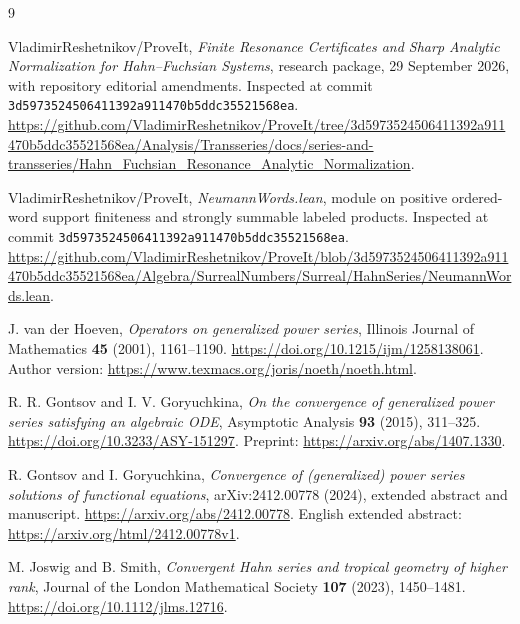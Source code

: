 \documentclass[11pt,a4paper]{article}
\numberwithin{equation}{section}
\theoremstyle{definition}
\theoremstyle{remark}
\newcommand{\snap}{\texttt{3d5973524506411392a911470b5ddc35521568ea}}
\begin{document}
\clearpage
\begin{thebibliography}{9}
\raggedright
{}
VladimirReshetnikov/ProveIt,
\emph{Finite Resonance Certificates and Sharp Analytic Normalization for
Hahn--Fuchsian Systems}, research package, 29 September 2026, with repository
editorial amendments. Inspected at commit \snap.
\url{https://github.com/VladimirReshetnikov/ProveIt/tree/3d5973524506411392a911470b5ddc35521568ea/Analysis/Transseries/docs/series-and-transseries/Hahn_Fuchsian_Resonance_Analytic_Normalization}.

VladimirReshetnikov/ProveIt,
\emph{NeumannWords.lean}, module on positive ordered-word support finiteness
and strongly summable labeled products. Inspected at commit \snap.
\url{https://github.com/VladimirReshetnikov/ProveIt/blob/3d5973524506411392a911470b5ddc35521568ea/Algebra/SurrealNumbers/Surreal/HahnSeries/NeumannWords.lean}.

J. van der Hoeven,
\emph{Operators on generalized power series},
Illinois Journal of Mathematics \textbf{45} (2001), 1161--1190.
\url{https://doi.org/10.1215/ijm/1258138061}.
Author version: \url{https://www.texmacs.org/joris/noeth/noeth.html}.

R. R. Gontsov and I. V. Goryuchkina,
\emph{On the convergence of generalized power series satisfying an
algebraic ODE}, Asymptotic Analysis \textbf{93} (2015), 311--325.
\url{https://doi.org/10.3233/ASY-151297}.
Preprint: \url{https://arxiv.org/abs/1407.1330}.

R. Gontsov and I. Goryuchkina,
\emph{Convergence of (generalized) power series solutions of functional
equations}, arXiv:2412.00778 (2024), extended abstract and manuscript.
\url{https://arxiv.org/abs/2412.00778}.
English extended abstract: \url{https://arxiv.org/html/2412.00778v1}.

M. Joswig and B. Smith,
\emph{Convergent Hahn series and tropical geometry of higher rank},
Journal of the London Mathematical Society \textbf{107} (2023), 1450--1481.
\url{https://doi.org/10.1112/jlms.12716}.
\end{thebibliography}
\end{document}
